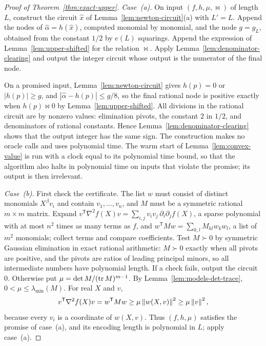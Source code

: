 \begin{proof}[Proof of Theorem~\ref{thm:exact-upper}]
\emph{Case~(a).} On input $(f,h,\mu,{\bowtie})$ of length $L$, construct the
circuit $\hat x$ of Lemma~\ref{lem:newton-circuit}(a) with $L'=L$. Append the
nodes of $\hat\alpha=h(\hat x)$, computed monomial by monomial, and the node
$g=g_L$, obtained from the constant $1/2$ by $e(L)$ squarings. Append the
expression of Lemma~\ref{lem:upper-shifted} for the relation ${\bowtie}$.
Apply Lemma~\ref{lem:denominator-clearing} and output the integer circuit
whose output is the numerator of the final node.

On a promised input, Lemma~\ref{lem:newton-circuit} gives $h(p)=0$ or
$|h(p)|\ge g$, and $|\hat\alpha-h(p)|\le g/8$, so the final rational node is
positive exactly when $h(p)\bowtie0$ by Lemma~\ref{lem:upper-shifted}. All
divisions in the rational circuit are by nonzero values: elimination pivots,
the constant $2$ in $1/2$, and denominators of rational constants. Hence
Lemma~\ref{lem:denominator-clearing} shows that the output integer has the
same sign. The construction makes no oracle calls and uses polynomial time.
The warm start of Lemma~\ref{lem:convex-value} is run with a clock equal to
its polynomial time bound, so that the algorithm also halts in polynomial
time on inputs that violate the promise; its output is then irrelevant.

\emph{Case~(b).} First check the certificate. The list $w$ must consist of
distinct monomials $X^\beta v_i$ and contain $v_1,\ldots,v_n$, and $M$ must be
a symmetric rational $m\times m$ matrix. Expand
$v^{\mathsf T}\nabla^2f(X)v=\sum_{i,j}v_iv_j\,\partial_i\partial_jf(X)$, a sparse
polynomial with at most $n^2$ times as many terms as $f$, and
$w^{\mathsf T}Mw=\sum_{k,l}M_{kl}w_kw_l$, a list of $m^2$ monomials; collect
terms and compare coefficients. Test $M\succ0$ by symmetric Gaussian
elimination in exact rational arithmetic: $M\succ0$ exactly when all pivots
are positive, and the pivots are ratios of leading principal minors, so all
intermediate numbers have polynomial length. If a check fails, output the
circuit $0$. Otherwise put $\mu=\det M/(\operatorname{tr} M)^{m-1}$. By
Lemma~\ref{lem:models-det-trace}, $0<\mu\le\lambda_{\min}(M)$. For real $X$
and $v$,
\[
 v^{\mathsf T}\nabla^2f(X)v=w^{\mathsf T}Mw\ge\mu\left\lVert w(X,v)\right\rVert^2
 \ge\mu\left\lVert v\right\rVert^2,
\]
because every $v_i$ is a coordinate of $w(X,v)$. Thus $(f,h,\mu)$ satisfies
the promise of case~(a), and its encoding length is polynomial in $L$; apply
case~(a).
\end{proof}

